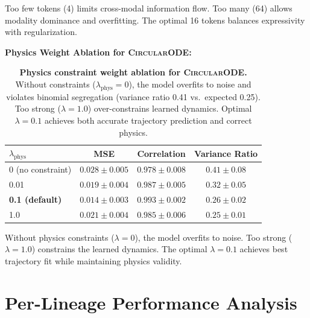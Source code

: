 \documentclass{article}
\newcommand{\circularode}{\textsc{CircularODE}}
\begin{document}
Too few tokens (4) limits cross-modal information flow. Too many (64) allows modality dominance and overfitting. The optimal 16 tokens balances expressivity with regularization.

\textbf{Physics Weight Ablation for \circularode{}:}

\begin{table}[h]
\caption{\textbf{Physics constraint weight ablation for \circularode{}.} Without constraints ($\lambda_{\text{phys}}=0$), the model overfits to noise and violates binomial segregation (variance ratio 0.41 vs.\ expected 0.25). Too strong ($\lambda=1.0$) over-constrains learned dynamics. Optimal $\lambda=0.1$ achieves both accurate trajectory prediction and correct physics.}
\centering
\small
\begin{tabular}{@{}lccc@{}}
\toprule
$\lambda_{\text{phys}}$ & MSE & Correlation & Variance Ratio \\
\midrule
0 (no constraint) & $0.028 \pm 0.005$ & $0.978 \pm 0.008$ & $0.41 \pm 0.08$ \\
0.01 & $0.019 \pm 0.004$ & $0.987 \pm 0.005$ & $0.32 \pm 0.05$ \\
\textbf{0.1 (default)} & $\mathbf{0.014 \pm 0.003}$ & $\mathbf{0.993 \pm 0.002}$ & $\mathbf{0.26 \pm 0.02}$ \\
1.0 & $0.021 \pm 0.004$ & $0.985 \pm 0.006$ & $0.25 \pm 0.01$ \\
\bottomrule
\end{tabular}
\end{table}

Without physics constraints ($\lambda=0$), the model overfits to noise. Too strong ($\lambda=1.0$) constrains the learned dynamics. The optimal $\lambda=0.1$ achieves best trajectory fit while maintaining physics validity.

\section{Per-Lineage Performance Analysis}
\label{app:lineage}
\end{document}
